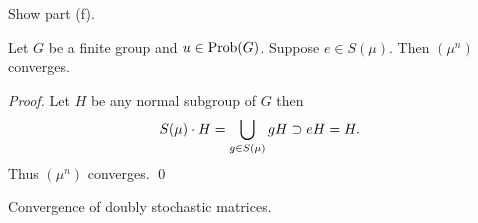  Show part (f).

\begin{corollary} 	\label{cor:3.1}
Let $G$ be a finite group and $u \in \hbox{Prob}(G)$.
Suppose $e \in S(\mu)$.  Then $(\mu^n)$ converges.
\end{corollary}

\begin{proof}  Let $H$ be any normal subgroup of $G$ then
\[
     S(\mu) \cdot H = \bigcup_{g \in S(\mu)} gH \supset eH = H.
\]
Thus $(\mu^n)$ converges.
\qed
\end{proof}

 Convergence of doubly stochastic matrices.
